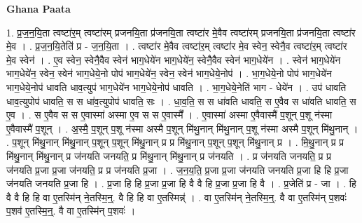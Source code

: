 \documentclass[17pt]{extarticle}
\begin{document}
\textbf{Ghana Paata } \newline

1. प्र॒ज॒न॒यि॒ता त्वष्टा॑र॒म् त्वष्टा॑रम् प्रजनयि॒ता प्र॑जनयि॒ता त्वष्टा॑र मे॒वैव त्वष्टा॑रम् प्रजनयि॒ता प्र॑जनयि॒ता त्वष्टा॑र मे॒व । . प्र॒ज॒न॒यि॒तेति॑ प्र - ज॒न॒यि॒ता । . त्वष्टा॑र मे॒वैव त्वष्टा॑र॒म् त्वष्टा॑र मे॒व स्वेन॒ स्वेनै॒व त्वष्टा॑र॒म् त्वष्टा॑र मे॒व स्वेन॑ । . ए॒व स्वेन॒ स्वेनै॒वैव स्वेन॑ भाग॒धेये॑न भाग॒धेये॑न॒ स्वेनै॒वैव स्वेन॑ भाग॒धेये॑न । . स्वेन॑ भाग॒धेये॑न भाग॒धेये॑न॒ स्वेन॒ स्वेन॑ भाग॒धेये॒नो पोप॑ भाग॒धेये॑न॒ स्वेन॒ स्वेन॑ भाग॒धेये॒नोप॑ । . भा॒ग॒धेये॒नो पोप॑ भाग॒धेये॑न भाग॒धेये॒नोप॑ धावति धाव॒त्युप॑ भाग॒धेये॑न भाग॒धेये॒नोप॑ धावति । . भा॒ग॒धेये॒नेति॑ भाग - धेये॑न । . उप॑ धावति धाव॒त्युपोप॑ धावति॒ स स धा॑व॒त्युपोप॑ धावति॒ सः । . धा॒व॒ति॒ स स धा॑वति धावति॒ स ए॒वैव स धा॑वति धावति॒ स ए॒व । . स ए॒वैव स स ए॒वास्मा॑ अस्मा ए॒व स स ए॒वास्मै᳚ । . ए॒वास्मा॑ अस्मा ए॒वैवास्मै॑ प॒शून् प॒शू न॑स्मा ए॒वैवास्मै॑ प॒शून् । . अ॒स्मै॒ प॒शून् प॒शू न॑स्मा अस्मै प॒शून् मि॑थु॒नान् मि॑थु॒नान् प॒शू न॑स्मा अस्मै प॒शून् मि॑थु॒नान् । . प॒शून् मि॑थु॒नान् मि॑थु॒नान् प॒शून् प॒शून् मि॑थु॒नान् प्र प्र मि॑थु॒नान् प॒शून् प॒शून् मि॑थु॒नान् प्र । . मि॒थु॒नान् प्र प्र मि॑थु॒नान् मि॑थु॒नान् प्र ज॑नयति जनयति॒ प्र मि॑थु॒नान् मि॑थु॒नान् प्र ज॑नयति । . प्र ज॑नयति जनयति॒ प्र प्र ज॑नयति प्र॒जा प्र॒जा ज॑नयति॒ प्र प्र ज॑नयति प्र॒जा । . ज॒न॒य॒ति॒ प्र॒जा प्र॒जा ज॑नयति जनयति प्र॒जा हि हि प्र॒जा ज॑नयति जनयति प्र॒जा हि । . प्र॒जा हि हि प्र॒जा प्र॒जा हि वै वै हि प्र॒जा प्र॒जा हि वै । . प्र॒जेति॑ प्र - जा । . हि वै वै हि हि वा ए॒तस्मि॑न् ने॒तस्मि॒न्॒. वै हि हि वा ए॒तस्मिन्न्॑ । . वा ए॒तस्मि॑न् ने॒तस्मि॒न्॒. वै वा ए॒तस्मि॑न् प॒शवः॑ प॒शव॑ ए॒तस्मि॒न्॒. वै वा ए॒तस्मि॑न् प॒शवः॑ । \newline
\end{document}
